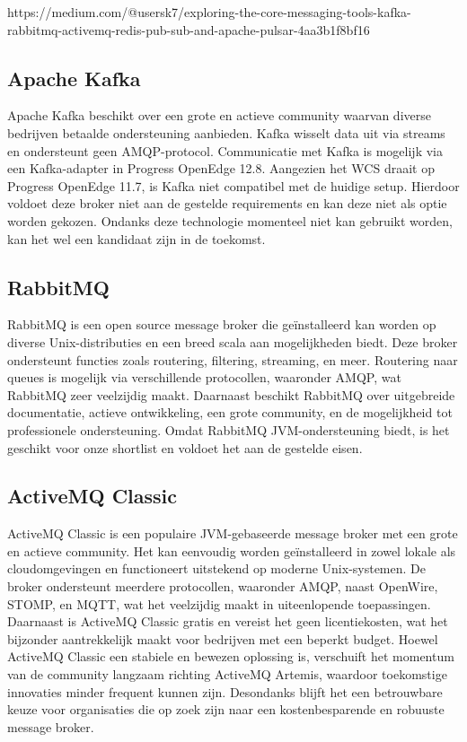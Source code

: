   https://medium.com/@usersk7/exploring-the-core-messaging-tools-kafka-rabbitmq-activemq-redis-pub-sub-and-apache-pulsar-4aa3b1f8bf16

  \subsection{Apache Kafka}
  Apache Kafka beschikt over een grote en actieve community waarvan diverse bedrijven betaalde ondersteuning aanbieden.
  Kafka wisselt data uit via streams en ondersteunt geen AMQP-protocol. 
  Communicatie met Kafka is mogelijk via een Kafka-adapter in Progress OpenEdge 12.8.
  Aangezien het WCS draait op Progress OpenEdge 11.7, is Kafka niet compatibel met de huidige setup.
  Hierdoor voldoet deze broker niet aan de gestelde requirements en kan deze niet als optie worden gekozen.
  Ondanks deze technologie momenteel niet kan gebruikt worden, kan het wel een kandidaat zijn in de toekomst.

  \subsection{RabbitMQ}
  RabbitMQ is een open source message broker die geïnstalleerd kan worden op diverse Unix-distributies en een breed scala aan mogelijkheden biedt.
  Deze broker ondersteunt functies zoals routering, filtering, streaming, en meer.
  Routering naar queues is mogelijk via verschillende protocollen, waaronder AMQP, wat RabbitMQ zeer veelzijdig maakt.
  Daarnaast beschikt RabbitMQ over uitgebreide documentatie, actieve ontwikkeling, een grote community, en de mogelijkheid tot professionele ondersteuning.
  Omdat RabbitMQ JVM-ondersteuning biedt, is het geschikt voor onze shortlist en voldoet het aan de gestelde eisen.

  \subsection{ActiveMQ Classic}
  ActiveMQ Classic is een populaire JVM-gebaseerde message broker met een grote en actieve community.
  Het kan eenvoudig worden geïnstalleerd in zowel lokale als cloudomgevingen en functioneert uitstekend op moderne Unix-systemen.
  De broker ondersteunt meerdere protocollen, waaronder AMQP, naast OpenWire, STOMP, en MQTT, wat het veelzijdig maakt in uiteenlopende toepassingen.
  Daarnaast is ActiveMQ Classic gratis en vereist het geen licentiekosten, wat het bijzonder aantrekkelijk maakt voor bedrijven met een beperkt budget.
  Hoewel ActiveMQ Classic een stabiele en bewezen oplossing is, verschuift het momentum van de community langzaam richting ActiveMQ Artemis, 
  waardoor toekomstige innovaties minder frequent kunnen zijn.
  Desondanks blijft het een betrouwbare keuze voor organisaties die op zoek zijn naar een kostenbesparende en robuuste message broker.

